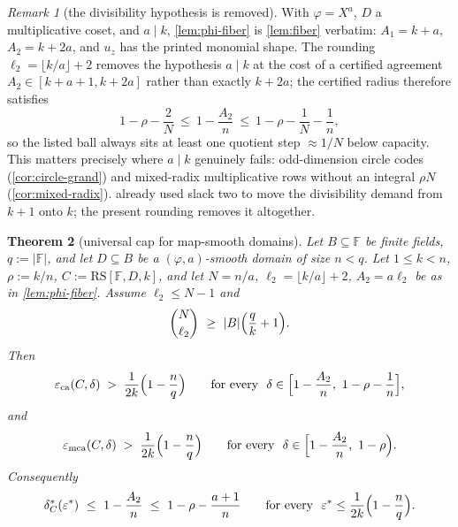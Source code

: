\documentclass[11pt]{article}
\newtheorem{theorem}{Theorem}[section]
\theoremstyle{definition}
\theoremstyle{remark}
\newtheorem{remark}[theorem]{Remark}
\newcommand{\F}{\mathbb{F}}
\newcommand{\B}{B}
\newcommand{\RS}{\mathrm{RS}}
\newcommand{\eca}{\varepsilon_{\mathrm{ca}}}
\newcommand{\emca}{\varepsilon_{\mathrm{mca}}}
\begin{document}
\begin{remark}[the divisibility hypothesis is removed]\label{rem:no-divisibility}
With $\varphi=X^a$, $D$ a multiplicative coset, and $a\mid k$, \cref{lem:phi-fiber} is \cref{lem:fiber} verbatim: $A_1=k+a$, $A_2=k+2a$, and $u_z$ has the printed monomial shape. The rounding $\ell_2=\lfloor k/a\rfloor+2$ removes the hypothesis $a\mid k$ at the cost of a certified agreement $A_2\in[k+a+1,k+2a]$ rather than exactly $k+2a$; the certified radius therefore satisfies
\[
1-\rho-\frac2N\ \le\ 1-\frac{A_2}n\ \le\ 1-\rho-\frac1N-\frac1n,
\]
so the listed ball always sits at least one quotient step $\approx1/N$ below capacity. This matters precisely where $a\mid k$ genuinely fails: odd-dimension circle codes (\cref{cor:circle-grand}) and mixed-radix multiplicative rows without an integral $\rho N$ (\cref{cor:mixed-radix}).  already used slack two to move the divisibility demand from $k+1$ onto $k$; the present rounding removes it altogether.
\end{remark}

\begin{theorem}[universal cap for map-smooth domains]\label{thm:phi-cap}
Let $\B\subseteq\F$ be finite fields, $q:=|\F|$, and let $D\subseteq\B$ be a $(\varphi,a)$-smooth domain of size $n<q$. Let $1\le k<n$, $\rho:=k/n$, $C:=\RS[\F,D,k]$, and let $N=n/a$, $\ell_2=\lfloor k/a\rfloor+2$, $A_2=a\ell_2$ be as in \cref{lem:phi-fiber}. Assume $\ell_2\le N-1$ and
\begin{equation}\label{eq:hyp-phi}
\binom N{\ell_2}\ \ge\ |\B|\Bigl(\frac qk+1\Bigr).
\end{equation}
Then
\[
\eca(C,\delta)\;>\;\frac1{2k}\Bigl(1-\frac nq\Bigr)
\qquad\text{for every }\ \delta\in\Bigl[1-\frac{A_2}n,\ 1-\rho-\frac1n\Bigr],
\]
and
\[
\emca(C,\delta)\;>\;\frac1{2k}\Bigl(1-\frac nq\Bigr)
\qquad\text{for every }\ \delta\in\Bigl[1-\frac{A_2}n,\ 1-\rho\Bigr).
\]
Consequently
\[
\delta^*_C(\varepsilon^*)\ \le\ 1-\frac{A_2}n\ \le\ 1-\rho-\frac{a+1}n
\qquad\text{for every }\ \varepsilon^*\le\frac1{2k}\Bigl(1-\frac nq\Bigr).
\]
\end{theorem}
\end{document}
